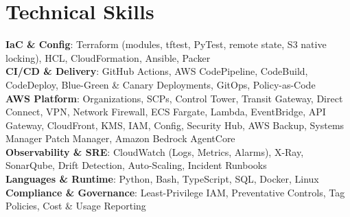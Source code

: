 \section{\textbf{Technical Skills}}
\vspace{-2pt}
\begin{itemize}[leftmargin=0.05in, label={}]
    \small{\item{
     \textbf{IaC \& Config}{: Terraform (modules, tftest, PyTest, remote state, S3 native locking), HCL, CloudFormation, Ansible, Packer} \\
     \textbf{CI/CD \& Delivery}{: GitHub Actions, AWS CodePipeline, CodeBuild, CodeDeploy, Blue-Green \& Canary Deployments, GitOps, Policy-as-Code} \\
     \textbf{AWS Platform}{: Organizations, SCPs, Control Tower, Transit Gateway, Direct Connect, VPN, Network Firewall, ECS Fargate, Lambda, EventBridge, API Gateway, CloudFront, KMS, IAM, Config, Security Hub, AWS Backup, Systems Manager Patch Manager, Amazon Bedrock AgentCore} \\
     \textbf{Observability \& SRE}{: CloudWatch (Logs, Metrics, Alarms), X-Ray, SonarQube, Drift Detection, Auto-Scaling, Incident Runbooks} \\
     \textbf{Languages \& Runtime}{: Python, Bash, TypeScript, SQL, Docker, Linux} \\
     \textbf{Compliance \& Governance}{: Least-Privilege IAM, Preventative Controls, Tag Policies, Cost \& Usage Reporting}
    }}
\end{itemize}
\vspace{-2mm}
